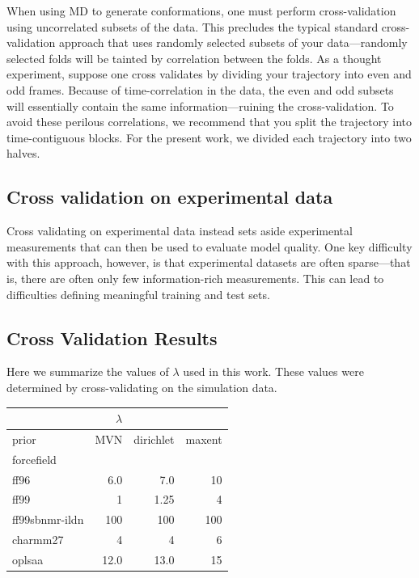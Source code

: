 \documentclass[12pt]{article}
\begin{document}
When using MD to generate conformations, one must perform cross-validation using uncorrelated subsets of the data.  This precludes the typical standard cross-validation approach that uses randomly selected subsets of your data---randomly selected folds will be tainted by correlation between the folds.  As a thought experiment, suppose one cross validates by dividing your trajectory into even and odd frames.  Because of time-correlation in the data, the even and odd subsets will essentially contain the same information---ruining the cross-validation.  To avoid these perilous correlations, we recommend that you split the trajectory into time-contiguous blocks.  For the present work, we divided each trajectory into two halves.  

\subsection*{Cross validation on experimental data}

Cross validating on experimental data instead sets aside experimental measurements that can then be used to evaluate model quality.  One key difficulty with this approach, however, is that experimental datasets are often sparse---that is, there are often only few information-rich measurements.  This can lead to difficulties defining meaningful training and test sets.  

\subsection*{Cross Validation Results}

Here we summarize the values of $\lambda$ used in this work.  These values were determined by cross-validating on the simulation data.  

\vspace{5mm}

\begin{tabular}{lrrr}
\toprule
{}                &$\lambda$  &   &      \\
\midrule
prior &       MVN &  dirichlet & maxent \\
forcefield        &           &         \\
ff96           &      6.0  &    7.0  & 10 \\
ff99           &      1    &    1.25 & 4 \\
ff99sbnmr-ildn &      100  &    100  & 100 \\
charmm27          &      4    &   4     & 6 \\
oplsaa            &     12.0 &    13.0  & 15 \\
\bottomrule
\end{tabular}
\end{document}
